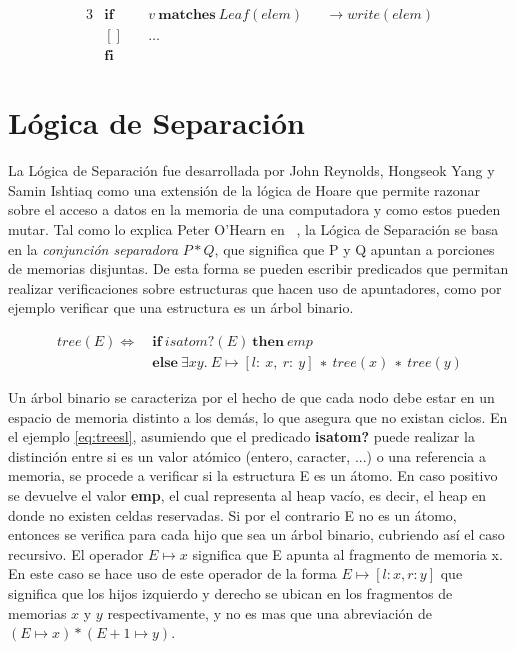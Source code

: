 \begin{alignat}{3}
&\boldsymbol{if}\ && v\ \boldsymbol{matches}\ Leaf(elem)         && \rightarrow write(elem) \nonumber \\
&\boldsymbol{[]}\ && \ldots                                                        \label{matches} \\
&\boldsymbol{fi} \nonumber
\end{alignat}


\section{Lógica de Separación}

La Lógica de Separación fue desarrollada por John Reynolds, Hongseok Yang y
Samin Ishtiaq \cite{seplogpaper1}\cite{seplogpaper2}\cite{seplogpaper3} como una
extensión de la lógica de Hoare que permite razonar sobre el acceso a datos en
la memoria de una computadora y como estos pueden mutar. Tal como lo explica
Peter O'Hearn en ~\cite{separation-logic}, la Lógica de Separación se basa en
la \textit{conjunción separadora} $P * Q$, que significa que P y Q apuntan a
porciones de memorias disjuntas. De esta forma se pueden escribir predicados
que permitan realizar verificaciones sobre estructuras que hacen uso de
apuntadores, como por ejemplo verificar que una estructura es un árbol
binario.

\begin{align}
  tree(E) \Longleftrightarrow\ &\boldsymbol{if}\ isatom?(E)\ \boldsymbol{then}\ emp \label{eq:treesl}\\
             &\boldsymbol{else}\ \exists xy.\ E\mapsto[l:\ x,\ r:\ y]\ ∗\ tree(x)\ ∗\ tree(y) \nonumber
\end{align}

Un árbol binario se caracteriza por el hecho de que cada nodo debe estar en un
espacio de memoria distinto a los demás, lo que asegura que no existan ciclos.
En el ejemplo \ref{eq:treesl}, asumiendo que el predicado \textbf{isatom?} puede realizar
la distinción entre si es un valor atómico (entero, caracter, ...) o una
referencia a memoria, se procede a verificar si la estructura E es un átomo.
En caso positivo se devuelve el valor \textbf{emp}, el cual representa al heap
vacío, es decir, el heap en donde no existen celdas reservadas. Si por el
contrario E no es un átomo, entonces se verifica para cada hijo que sea un
árbol binario, cubriendo así el caso recursivo. El operador 
$E\mapsto x$ significa que E apunta al fragmento de memoria x. En este caso se
hace uso de este operador de la forma $E\mapsto [l: x, r: y]$ que significa que
los hijos izquierdo y derecho se ubican en los fragmentos de memorias $x$ y $y$
respectivamente, y no es mas que una abreviación de $(E\mapsto x) * (E+1\mapsto y)$.

